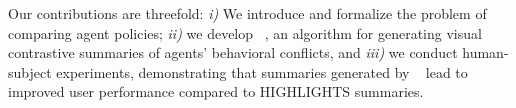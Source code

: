 
Our contributions are threefold: \textit{i)} We introduce and formalize the
problem of comparing agent policies;  \textit{ii)} we develop \disalg~, an
algorithm for generating visual contrastive summaries of agents' behavioral
conflicts, and \textit{iii)} we conduct human-subject experiments, demonstrating
that summaries generated by \disalg~ lead to improved user performance compared
to HIGHLIGHTS summaries.

